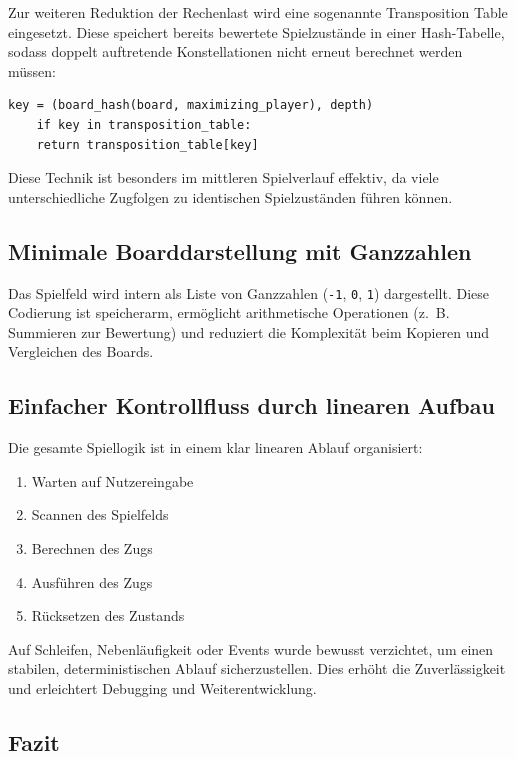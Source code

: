 Zur weiteren Reduktion der Rechenlast wird eine sogenannte Transposition Table eingesetzt. Diese speichert bereits bewertete Spielzustände in einer Hash-Tabelle, sodass doppelt auftretende Konstellationen nicht erneut berechnet werden müssen:

\begin{lstlisting}[style=pythonstyle]
	key = (board_hash(board, maximizing_player), depth)
	if key in transposition_table:
	return transposition_table[key]
\end{lstlisting}

Diese Technik ist besonders im mittleren Spielverlauf effektiv, da viele unterschiedliche Zugfolgen zu identischen Spielzuständen führen können.

\subsection{Minimale Boarddarstellung mit Ganzzahlen}

Das Spielfeld wird intern als Liste von Ganzzahlen (\texttt{-1}, \texttt{0}, \texttt{1}) dargestellt. Diese Codierung ist speicherarm, ermöglicht arithmetische Operationen (z.~B. Summieren zur Bewertung) und reduziert die Komplexität beim Kopieren und Vergleichen des Boards.

\subsection{Einfacher Kontrollfluss durch linearen Aufbau}

Die gesamte Spiellogik ist in einem klar linearen Ablauf organisiert:

\begin{enumerate}
	\item Warten auf Nutzereingabe
	\item Scannen des Spielfelds
	\item Berechnen des Zugs
	\item Ausführen des Zugs
	\item Rücksetzen des Zustands
\end{enumerate}

Auf Schleifen, Nebenläufigkeit oder Events wurde bewusst verzichtet, um einen stabilen, deterministischen Ablauf sicherzustellen. Dies erhöht die Zuverlässigkeit und erleichtert Debugging und Weiterentwicklung.

\subsection*{Fazit}


